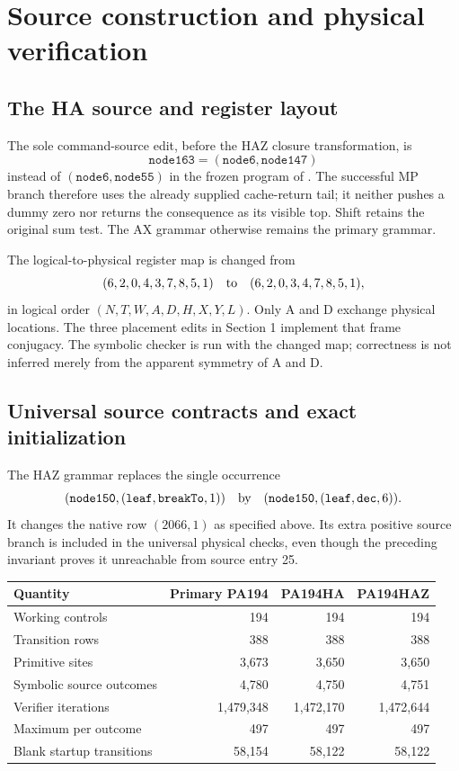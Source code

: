 \documentclass[11pt]{article}
\begin{document}
\section{Source construction and physical verification}

\subsection{The HA source and register layout}

The sole command-source edit, before the HAZ closure transformation, is
\[
 \texttt{node163}=(\texttt{node6},\texttt{node147})
\]
instead of $(\texttt{node6},\texttt{node55})$ in the frozen program of
\cite{program}. The successful MP branch therefore uses the already
supplied cache-return tail; it neither pushes a dummy zero nor returns the
consequence as its visible top. Shift retains the original sum test.
The AX grammar otherwise remains the primary grammar.

The logical-to-physical register map is changed from
\[
 (6,2,0,4,3,7,8,5,1)\quad\hbox{to}\quad(6,2,0,3,4,7,8,5,1),
\]
in logical order $(N,T,W,A,D,H,X,Y,L)$. Only A and D exchange physical
locations. The three placement edits in Section 1 implement that frame
conjugacy. The symbolic checker is run with the changed map; correctness
is not inferred merely from the apparent symmetry of A and D.



\subsection{Universal source contracts and exact initialization}

The HAZ grammar replaces the single occurrence
\[
 (\texttt{node150},(\texttt{leaf},\texttt{breakTo},1))
 \quad\hbox{by}\quad
 (\texttt{node150},(\texttt{leaf},\texttt{dec},6)).
\]
It changes the native row $(2066,1)$ as specified above. Its extra positive
source branch is included in the universal physical checks, even though
the preceding invariant proves it unreachable from source entry 25.

\begin{center}
\begin{tabular}{lrrr}
\toprule
Quantity & Primary PA194 & PA194HA & PA194HAZ\\
\midrule
Working controls & 194 & 194 & 194\\
Transition rows & 388 & 388 & 388\\
Primitive sites & 3,673 & 3,650 & 3,650\\
Symbolic source outcomes & 4,780 & 4,750 & 4,751\\
Verifier iterations & 1,479,348 & 1,472,170 & 1,472,644\\
Maximum per outcome & 497 & 497 & 497\\
Blank startup transitions & 58,154 & 58,122 & 58,122\\
\bottomrule
\end{tabular}
\end{center}
\end{document}
